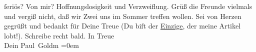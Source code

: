                ſeriös?\pend
           \pstart
           Von mir? Hoffnungslosigkeit und Verzweiflung.\pend
           \pstart
           Grüß die Freunde vielmals und vergiß nicht, daß wir Zwei uns im Sommer treffen
               wollen. Sei von Herzen gegrüßt und bedankt für Deine Treue (Du biſt der \uline{Einzige}, der meine Artikel lobt!). Schreibe recht
               bald.\pend
           \pstart
           In Treue {\\[\baselineskip]}Dein \spacefill\mbox{Paul Goldm}\pend
           \leftskip=0em{}\endnumbering{}\begin{anhang}\end{anhang}
      